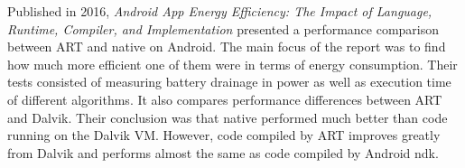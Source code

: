 Published in 2016, \emph{Android App Energy Efficiency: The Impact of Language, Runtime, Compiler, and Implementation} \cite{Chen2016} presented a performance comparison between ART and native on Android. The main focus of the report was to find how much more efficient one of them were in terms of energy consumption. Their tests consisted of measuring battery drainage in power as well as execution time of different algorithms. It also compares performance differences between ART and Dalvik. Their conclusion was that native performed much better than code running on the Dalvik VM. However, code compiled by ART improves greatly from Dalvik and performs almost the same as code compiled by Android \gls{ndk}.
